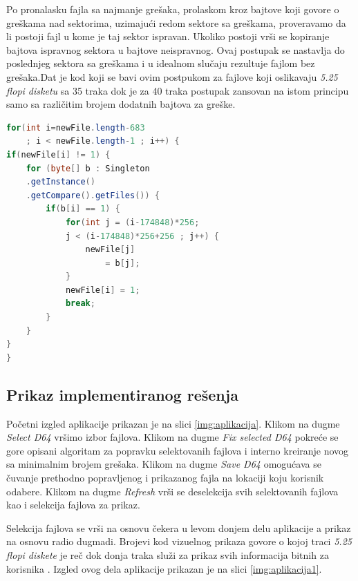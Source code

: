 Po pronalasku fajla sa najmanje grešaka, prolaskom kroz bajtove koji govore o greškama nad sektorima, uzimajući redom sektore sa greškama, proveravamo da li postoji fajl u kome je taj sektor ispravan. Ukoliko postoji vrši se kopiranje bajtova ispravnog sektora u bajtove neispravnog. Ovaj postupak se nastavlja do poslednjeg sektora sa greškama i u idealnom slučaju rezultuje fajlom bez grešaka.Dat je kod koji se bavi ovim postpukom za fajlove koji oslikavaju \textit{5.25 flopi disketu} sa 35 traka dok je za 40 traka postupak zansovan na istom principu samo sa različitim brojem dodatnih bajtova za greške.

\begin{lstlisting}[language=Java]
for(int i=newFile.length-683 
    ; i < newFile.length-1 ; i++) {
if(newFile[i] != 1) {
	for (byte[] b : Singleton
	.getInstance()
	.getCompare().getFiles()) {
		if(b[i] == 1) {
			for(int j = (i-174848)*256;
			j < (i-174848)*256+256 ; j++) {
				newFile[j] 
				    = b[j];
			}
			newFile[i] = 1;
			break;
		}
	}
}
}
\end{lstlisting}

\subsection{Prikaz implementiranog rešenja}

Početni izgled aplikacije prikazan je na slici \ref{img:aplikacija}. Klikom na dugme \textit{Select D64} vršimo izbor fajlova. Klikom na dugme \textit{Fix selected D64} pokreće se gore opisani algoritam za popravku selektovanih fajlova i interno kreiranje novog sa minimalnim brojem grešaka. Klikom na dugme \textit{Save D64} omogućava se čuvanje prethodno popravljenog i prikazanog fajla na lokaciji koju korisnik odabere. Klikom na dugme \textit{Refresh} vrši se deselekcija svih selektovanih fajlova kao i selekcija fajlova za prikaz.

Selekcija fajlova se vrši na osnovu čekera u levom donjem delu aplikacije a prikaz na osnovu radio dugmadi. Brojevi kod vizuelnog prikaza govore o kojoj traci \textit{5.25 flopi diskete} je reč dok donja traka služi za prikaz svih informacija bitnih za korisnika \cite{Projekat}. Izgled ovog dela aplikacije prikazan je na slici \ref{img:aplikacija1}.

